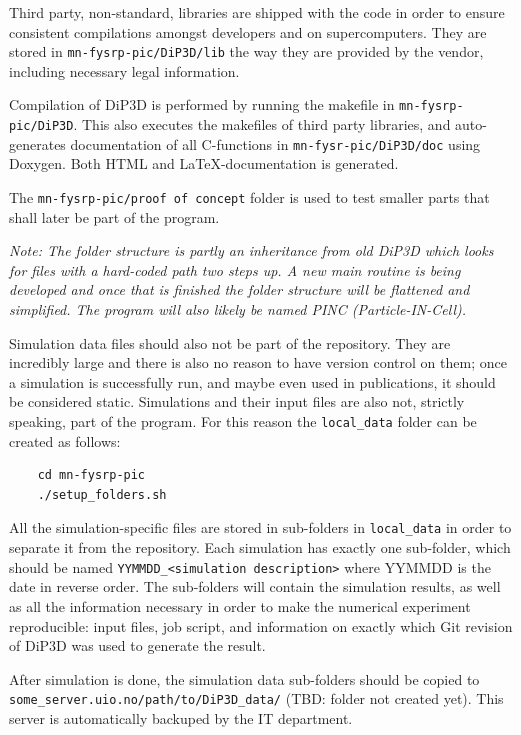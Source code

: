 \documentclass[10pt,a4paper]{article}
\begin{document}
Third party, non-standard, libraries are shipped with the code in order to ensure consistent compilations amongst developers and on supercomputers. They are stored in \verb$mn-fysrp-pic/DiP3D/lib$ the way they are provided by the vendor, including necessary legal information.

Compilation of DiP3D is performed by running the makefile in \verb$mn-fysrp-pic/DiP3D$. This also executes the makefiles of third party libraries, and auto-generates documentation of all C-functions in \verb$mn-fysr-pic/DiP3D/doc$ using Doxygen. Both HTML and LaTeX-documentation is generated. 

The \verb$mn-fysrp-pic/proof of concept$ folder is used to test smaller parts that shall later be part of the program.

\emph{Note: The folder structure is partly an inheritance from old DiP3D which looks for files with a hard-coded path two steps up. A new main routine is being developed and once that is finished the folder structure will be flattened and simplified. The program will also likely be named PINC (Particle-IN-Cell).}

Simulation data files should also not be part of the repository. They are incredibly large and there is also no reason to have version control on them; once a simulation is successfully run, and maybe even used in publications, it should be considered static. Simulations and their input files are also not, strictly speaking, part of the program. For this reason the \lstinline$local_data$ folder can be created as follows:

\begin{lstlisting}
	cd mn-fysrp-pic
	./setup_folders.sh
\end{lstlisting}

All the simulation-specific files are stored in sub-folders in \lstinline$local_data$ in order to separate it from the repository. Each simulation has exactly one sub-folder, which should be named \lstinline$YYMMDD_<simulation description>$ where YYMMDD is the date in reverse order. The sub-folders will contain the simulation results, as well as all the information necessary in order to make the numerical experiment reproducible: input files, job script, and information on exactly which Git revision of DiP3D was used to generate the result.

After simulation is done, the simulation data sub-folders should be copied to \lstinline$some_server.uio.no/path/to/DiP3D_data/$ (TBD: folder not created yet). This server is automatically backuped by the IT department.
\end{document}
